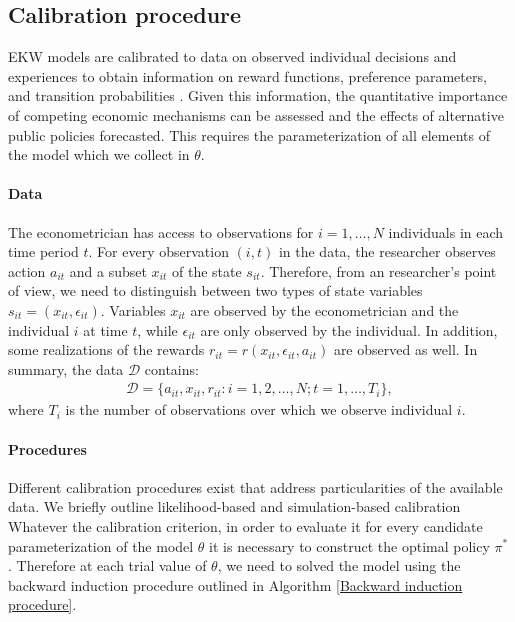 \subsection{Calibration procedure}\label{Estimation}
EKW models are calibrated to data on observed individual decisions and experiences to obtain information on reward functions, preference parameters, and transition probabilities \citep{Davidson.2003,Gourieroux.1996}. Given this information, the quantitative importance of competing economic mechanisms can be assessed and the effects of alternative public policies forecasted. This requires the parameterization of all elements of the model which we collect in $\theta$.

\paragraph{Data} The econometrician has access to observations for $i = 1, \hdots, N$ individuals in each time period $t$. For every observation $(i, t)$ in the data, the researcher observes action $a_{it}$ and a subset $x_{it}$ of the state $s_{it}$. Therefore, from an researcher's point of view, we need to distinguish between two types of state variables $s_{it} = (x_{it}, \epsilon_{it})$. Variables $x_{it}$ are observed by the econometrician and the individual $i$ at time $t$, while $\epsilon_{it}$ are only observed by the individual. In addition, some realizations of the rewards $r_{it} = r(x_{it}, \epsilon_{it}, a_{it})$ are observed as well. In summary, the data $\mathcal{D}$ contains:
%
\begin{align*}
  \mathcal{D} = \{a_{it}, x_{it}, r_{it}: i = 1,2, \hdots, N; t = 1, \hdots, T_i\},
\end{align*}
where $T_i$ is the number of observations over which we observe individual $i$.

\paragraph{Procedures} Different calibration procedures exist that address particularities of the available data. We briefly outline likelihood-based and simulation-based calibration  Whatever the calibration criterion, in order to evaluate it for every candidate parameterization of the model $\theta$ it is necessary to construct the optimal policy $\pi^*$. Therefore at each trial value of $\theta$, we need to solved the model using the backward induction procedure outlined in Algorithm \ref{Backward induction procedure}.

